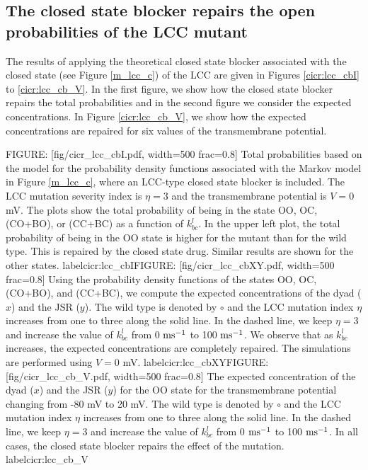
\subsection{The closed state blocker repairs the open probabilities of the LCC mutant}

The results of applying the theoretical closed state blocker associated with the closed state  (see Figure \ref{m_lcc_c}) of the LCC are given in Figures
\ref{cicr:lcc_cbI} to \ref{cicr:lcc_cb_V}. In the first figure, we show how the closed state blocker repairs the total probabilities and in the second figure we consider the expected concentrations. In Figure  \ref{cicr:lcc_cb_V}, we show how the expected concentrations are repaired for six values of the transmembrane potential.


FIGURE: [fig/cicr_lcc_cbI.pdf, width=500 frac=0.8] Total probabilities based on the model for the probability density functions associated with the Markov model
in Figure \ref{m_lcc_c}, where an LCC-type closed state blocker is included. The LCC mutation severity index is $\eta=3$ and the transmembrane potential is $V=0$ mV.
The plots show the total probability of being in the state OO, OC, (CO+BO), or (CC+BC) as a function of
$k^l_{bc}$. In the upper left plot, the total probability of being in the OO state is higher for the mutant than for the wild type. This is repaired by the closed state drug. Similar results are shown for the other states. label{cicr:lcc_cbI}FIGURE: [fig/cicr_lcc_cbXY.pdf, width=500 frac=0.8] Using the probability density functions of the states OO, OC, (CO+BO), and (CC+BC), we compute the
expected concentrations of the dyad ($x$) and the JSR ($y$). The wild type is denoted by $\circ$ and the LCC mutation index $\eta$ increases from one to three along the solid line. In the dashed line, we keep $\eta=3$ and increase the value of $k^l_{bc}$ from 0 $\rm{ms^{-1}}$ to 100 $\rm{ms^{-1}}$. We observe that as $k^l_{bc}$ increases, the
expected concentrations are completely repaired. The simulations are performed using $V=0$ mV. label{cicr:lcc_cbXY}FIGURE: [fig/cicr_lcc_cb_V.pdf, width=500 frac=0.8]  The expected  concentration of the dyad ($x$) and the JSR ($y$) for the OO state for the transmembrane potential
changing from -80 mV to 20 mV. The wild type is denoted by $\circ$ and the LCC mutation index $\eta$ increases from one to three along the solid line. In the dashed line, we keep $\eta=3$ and increase the value of $k^l_{bc}$ from 0 $\rm{ms^{-1}}$ to 100 $\rm{ms^{-1}}$.  In all cases, the closed state blocker repairs the effect of the mutation.
 label{cicr:lcc_cb_V}%

